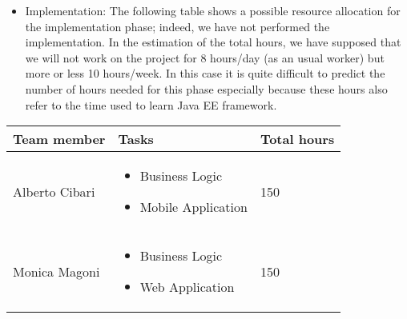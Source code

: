 \begin{itemize}
    \item Implementation:
    \newline The following table shows a possible resource allocation for the implementation phase; indeed, we have not performed the implementation.
     \newline
    In the estimation of the total hours, we have supposed that we will not work on the project for 8 hours/day (as an usual worker) but more or less 10 hours/week. In this case it is quite difficult to predict the number of hours needed for this phase especially because these hours also refer to the time used to learn Java EE framework.
\end{itemize}
\begin{table}[H]
    \centering
    \begin{tabular}{|l|p{8cm}|l|}
        \hline
        \textbf{Team member} & \textbf{Tasks} & \textbf{Total hours}\\
        \hline
        Alberto Cibari & \begin{itemize}
            \item Business Logic
            \item Mobile Application
        \end{itemize} & 150\\
        \hline
        Monica Magoni & \begin{itemize}
            \item Business Logic
            \item Web Application
        \end{itemize} & 150\\
        \hline
    \end{tabular}
\end{table}

